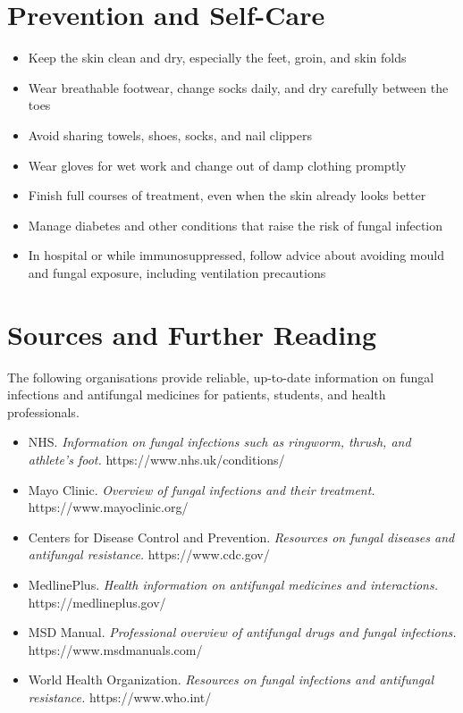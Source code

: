 \section*{Prevention and Self-Care}
\begin{itemize}
    \item Keep the skin clean and dry, especially the feet, groin, and skin folds
    \item Wear breathable footwear, change socks daily, and dry carefully between the toes
    \item Avoid sharing towels, shoes, socks, and nail clippers
    \item Wear gloves for wet work and change out of damp clothing promptly
    \item Finish full courses of treatment, even when the skin already looks better
    \item Manage diabetes and other conditions that raise the risk of fungal infection
    \item In hospital or while immunosuppressed, follow advice about avoiding mould and fungal exposure, including ventilation precautions
\end{itemize}

\section*{Sources and Further Reading}
The following organisations provide reliable, up-to-date information on fungal infections and antifungal medicines for patients, students, and health professionals.

\begin{itemize}
    \item NHS. \textit{Information on fungal infections such as ringworm, thrush, and athlete's foot.} https://www.nhs.uk/conditions/
    \item Mayo Clinic. \textit{Overview of fungal infections and their treatment.} https://www.mayoclinic.org/
    \item Centers for Disease Control and Prevention. \textit{Resources on fungal diseases and antifungal resistance.} https://www.cdc.gov/
    \item MedlinePlus. \textit{Health information on antifungal medicines and interactions.} https://medlineplus.gov/
    \item MSD Manual. \textit{Professional overview of antifungal drugs and fungal infections.} https://www.msdmanuals.com/
    \item World Health Organization. \textit{Resources on fungal infections and antifungal resistance.} https://www.who.int/
\end{itemize}
